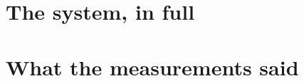 \documentclass[11pt,a4paper]{article}
\begin{document}
\part{The system, in full}



















\part{What the measurements said}



\clearpage


\end{document}
